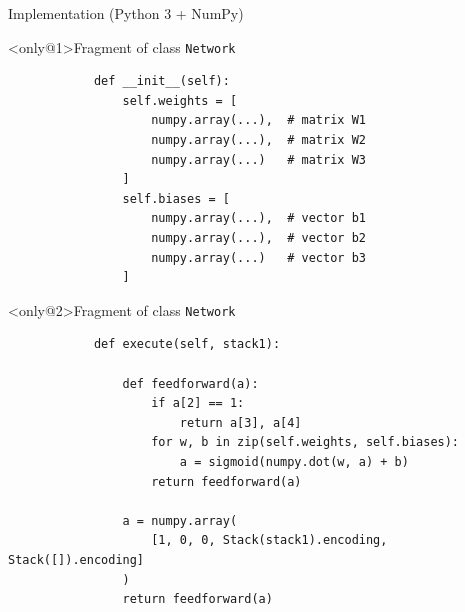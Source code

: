 \documentclass{beamer}
\begin{document}
\begin{frame}[fragile]{Implementation (Python 3 + NumPy)}
	\begin{block}<only@1>{Fragment of class \texttt{Network}}
		\begin{verbatim}
			def __init__(self):
			    self.weights = [
			        numpy.array(...),  # matrix W1
			        numpy.array(...),  # matrix W2
			        numpy.array(...)   # matrix W3
			    ]
			    self.biases = [
			        numpy.array(...),  # vector b1
			        numpy.array(...),  # vector b2
			        numpy.array(...)   # vector b3
			    ]
		\end{verbatim}
	\end{block}
	\begin{block}<only@2>{Fragment of class \texttt{Network}}
		\small
		\begin{verbatim}
			def execute(self, stack1):
			
			    def feedforward(a):
			        if a[2] == 1:
			            return a[3], a[4]
			        for w, b in zip(self.weights, self.biases):
			            a = sigmoid(numpy.dot(w, a) + b)
			        return feedforward(a)
									
			    a = numpy.array(
			        [1, 0, 0, Stack(stack1).encoding, Stack([]).encoding]
			    )
			    return feedforward(a)
		\end{verbatim}
	\end{block}
\end{frame}
\end{document}
